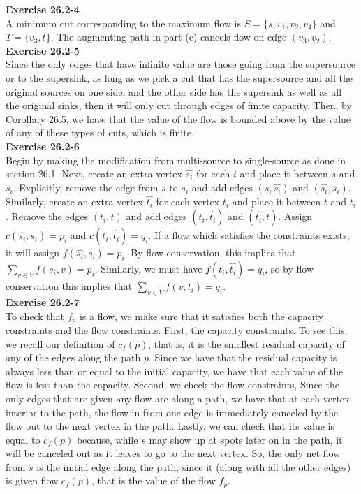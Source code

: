 \documentclass{article}
\begin{document}
\noindent\textbf{Exercise 26.2-4}\\

A minimum cut corresponding to the maximum flow is $S = \{s, v_1, v_2, v_4\}$ and $T= \{v_3, t\}$.  The augmenting path in part (c) cancels flow on edge $(v_3, v_2)$.\\

\noindent\textbf{Exercise 26.2-5}\\

Since the only edges that have infinite value are those going from the supersource or to the supersink, as long as we pick a cut that has the supersource and all the original sources on one side, and the other side has the supersink as well as all the original sinks, then it will only cut through edges of finite capacity. Then, by Corollary 26.5, we have that the value of the flow is bounded above by the value of any of these types of cuts, which is finite.\\

\noindent\textbf{Exercise 26.2-6}\\

Begin by making the modification from multi-source to single-source as done in section 26.1.  Next, create an extra vertex $\hat{s_i}$ for each $i$ and place it between $s$ and $s_i$.  Explicitly, remove the edge from $s$ to $s_i$ and add edges $(s, \hat{s_i})$ and $(\hat{s_i}, s_i)$.  Similarly, create an extra vertex $\hat{t_i}$ for each vertex $t_i$ and place it between $t$ and $t_i$.  Remove the edges $(t_i, t)$ and add edges $(t_i, \hat{t_i})$ and $(\hat{t_i}, t)$.  Assign $c(\hat{s_i},s_i) = p_i$ and $c(t_i, \hat{t_i}) = q_i$.  If a flow which satisfies the constraints exists, it will assign $f(\hat{s_i}, s_i) = p_i$.  By flow conservation, this implies that $\sum_{v \in V} f(s_i, v) = p_i$.  Similarly, we must have $f(t_i, \hat{t_i}) = q_i$, so by flow conservation this implies that $\sum_{v \in V} f(v,t_i) = q_i$.\\

\noindent\textbf{Exercise 26.2-7}\\

To check that $f_p$ is a flow, we make sure that it satisfies both the capacity constraints and the flow constraints. First, the capacity constraints. To see this, we recall our definition of $c_f(p)$, that is, it is the smallest residual capacity of any of the edges along the path $p$. Since we have that the residual capacity is always less than or equal to the initial capacity, we have that each value of the flow is less than the capacity. Second, we check the flow constraints, Since the only edges that are given any flow are along a path, we have that at each vertex interior to the path, the flow in from one edge is immediately canceled by the flow out to the next vertex in the path. Lastly, we can check that its value is equal to $c_f(p)$ because, while $s$ may show up at spots later on in the path, it will be canceled out as it leaves to go to the next vertex. So, the only net flow from $s$ is the initial edge along the path, since it (along with all the other edges) is given flow  $c_f(p)$, that is the value of the flow $f_p$.\\
\end{document}

